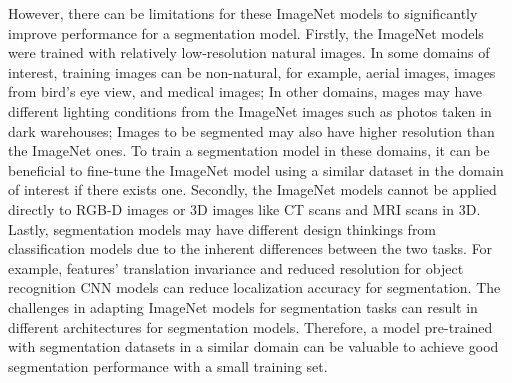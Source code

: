 

However, there can be limitations for these ImageNet models to significantly improve performance for a segmentation model.
Firstly, the ImageNet models were trained with relatively low-resolution natural images.
In some domains of interest, training images can be non-natural, for example, aerial images, images from bird's eye view, and medical images;
In other domains, mages may have different lighting conditions from the ImageNet images such as photos taken in dark warehouses;
Images to be segmented may also have higher resolution than the ImageNet ones.
To train a segmentation model in these domains, it can be beneficial to fine-tune the ImageNet model using a similar dataset in the domain of interest if there exists one.
Secondly, the ImageNet models cannot be applied directly to RGB-D images or 3D images like CT scans and MRI scans in 3D.
Lastly, segmentation models may have different design thinkings from classification models due to the inherent differences between the two tasks.
For example, features' translation invariance and reduced resolution for object recognition CNN models can reduce localization accuracy for segmentation.\cite{zheng2015conditional,chen2016deeplab}
The challenges in adapting ImageNet models for segmentation tasks can result in different architectures for segmentation models\cite{zheng2015conditional}.
Therefore, a model pre-trained with segmentation datasets in a similar domain can be valuable to achieve good segmentation performance with a small training set.




